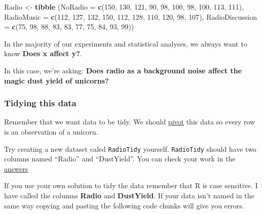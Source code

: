 \documentclass[
]{book}
\newenvironment{Shaded}{\begin{snugshade}}{\end{snugshade}}
\newcommand{\DataTypeTok}[1]{\textcolor[rgb]{0.13,0.29,0.53}{#1}}
\newcommand{\DecValTok}[1]{\textcolor[rgb]{0.00,0.00,0.81}{#1}}
\newcommand{\KeywordTok}[1]{\textcolor[rgb]{0.13,0.29,0.53}{\textbf{#1}}}
\newcommand{\NormalTok}[1]{#1}
\newcommand{\StringTok}[1]{\textcolor[rgb]{0.31,0.60,0.02}{#1}}
\begin{document}
\begin{Shaded}
\begin{Highlighting}[]
\NormalTok{Radio <-}\StringTok{ }\KeywordTok{tibble}\NormalTok{ (}\DataTypeTok{NoRadio =} \KeywordTok{c}\NormalTok{(}\DecValTok{150}\NormalTok{, }\DecValTok{130}\NormalTok{, }\DecValTok{121}\NormalTok{, }\DecValTok{90}\NormalTok{, }\DecValTok{98}\NormalTok{, }\DecValTok{100}\NormalTok{, }\DecValTok{98}\NormalTok{, }\DecValTok{100}\NormalTok{, }\DecValTok{113}\NormalTok{, }\DecValTok{111}\NormalTok{),}
                 \DataTypeTok{RadioMusic =} \KeywordTok{c}\NormalTok{(}\DecValTok{112}\NormalTok{, }\DecValTok{127}\NormalTok{, }\DecValTok{132}\NormalTok{, }\DecValTok{150}\NormalTok{, }\DecValTok{112}\NormalTok{, }\DecValTok{128}\NormalTok{, }\DecValTok{110}\NormalTok{, }\DecValTok{120}\NormalTok{, }\DecValTok{98}\NormalTok{, }\DecValTok{107}\NormalTok{),}
                 \DataTypeTok{RadioDiscussion =} \KeywordTok{c}\NormalTok{(}\DecValTok{75}\NormalTok{, }\DecValTok{98}\NormalTok{, }\DecValTok{88}\NormalTok{, }\DecValTok{83}\NormalTok{, }\DecValTok{83}\NormalTok{, }\DecValTok{77}\NormalTok{, }\DecValTok{75}\NormalTok{, }\DecValTok{84}\NormalTok{, }\DecValTok{93}\NormalTok{, }\DecValTok{99}\NormalTok{))}
\end{Highlighting}
\end{Shaded}

In the majority of our experiments and statistical analyses, we always want to know \textbf{Does x affect y?}.

In this case, we're asking: \textbf{Does radio as a background noise affect the magic dust yield of unicorns?}

\hypertarget{ex_tidyunicorns}{%
\subsubsection{Tidying this data}\label{ex_tidyunicorns}}

Remember that we want data to be tidy. We should \protect\hyperlink{pivoting_data}{pivot} this data so every row is an observation of a unicorn.

Try creating a new dataset caled \texttt{RadioTidy} yourself. \texttt{RadioTidy} should have two columns named ``Radio'' and ``DustYield''. You can check your work in the \protect\hyperlink{ans_tidyunicorns}{answers}

\begin{hey}
If you use your own solution to tidy the data remember that R is case
sensitive. I have called the columns \textbf{Radio} and
\textbf{DustYield}. If your data isn't named in the same way copying and
pasting the following code chunks will give you errors.
\end{hey}
\end{document}
